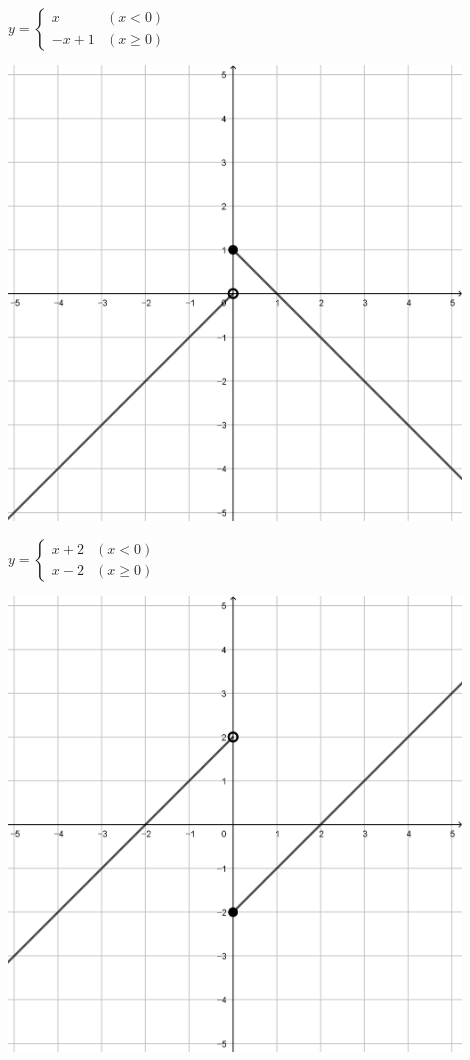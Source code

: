 \documentclass[a4paper]{oblivoir}
\begin{document}
\clearpage
\begin{minipage}{0.45\textwidth}\centering
\(y=\begin{cases}x&(x<0)\\-x+1&(x\ge0)\end{cases}\)
\par\bigskip\includegraphics[width=0.9\textwidth]{img/13-1}
\end{minipage}
\begin{minipage}{0.45\textwidth}\centering
\(y=\begin{cases}x+2&(x<0)\\x-2&(x\ge0)\end{cases}\)
\par\bigskip\includegraphics[width=0.9\textwidth]{img/13-2}
\end{minipage}\bigskip\bigskip\par
\end{document}
